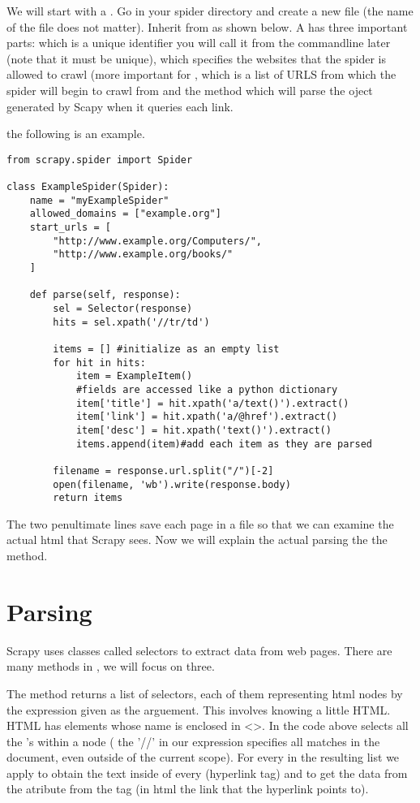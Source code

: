 We will start with a . Go in your spider directory and create a new file (the name of the file does not matter). Inherit from  as shown below. A  has three important parts:  which is a unique identifier you will call it from the commandline later (note that it must be unique),  which specifies the websites that the spider is allowed to crawl (more important for ,  which is a list of URLS from which the spider will begin to crawl from and the method  which will parse the  oject generated by Scapy when it queries each link.

the following is an example.
\begin{lstlisting}
from scrapy.spider import Spider

class ExampleSpider(Spider):
    name = "myExampleSpider"
    allowed_domains = ["example.org"]
    start_urls = [
        "http://www.example.org/Computers/",
        "http://www.example.org/books/"
    ]

    def parse(self, response):
        sel = Selector(response)
        hits = sel.xpath('//tr/td')

        items = [] #initialize as an empty list
        for hit in hits:
            item = ExampleItem()
			#fields are accessed like a python dictionary
            item['title'] = hit.xpath('a/text()').extract()
            item['link'] = hit.xpath('a/@href').extract()
            item['desc'] = hit.xpath('text()').extract()
            items.append(item)#add each item as they are parsed

		filename = response.url.split("/")[-2]
        open(filename, 'wb').write(response.body)
        return items

\end{lstlisting}

The two penultimate lines save each page in a file so that we can examine the actual html that Scrapy sees.
Now we will explain the actual parsing the the  method.

\section*{Parsing}
Scrapy uses classes called selectors to extract data from web pages.
There are many methods in , we will focus on three.

The  method returns a list of selectors, each of them representing html nodes by the expression given as the arguement. This involves knowing a little HTML. HTML has elements whose name is enclosed in <>. In the code above  selects  all the 's within a  node ( the '//' in our expression specifies all matches in the document, even outside of the current scope). For every  in the resulting list we apply  to obtain the text inside of every  (hyperlink tag) and  to get the data from the  atribute from the  tag (in html the link that the hyperlink points to). 

